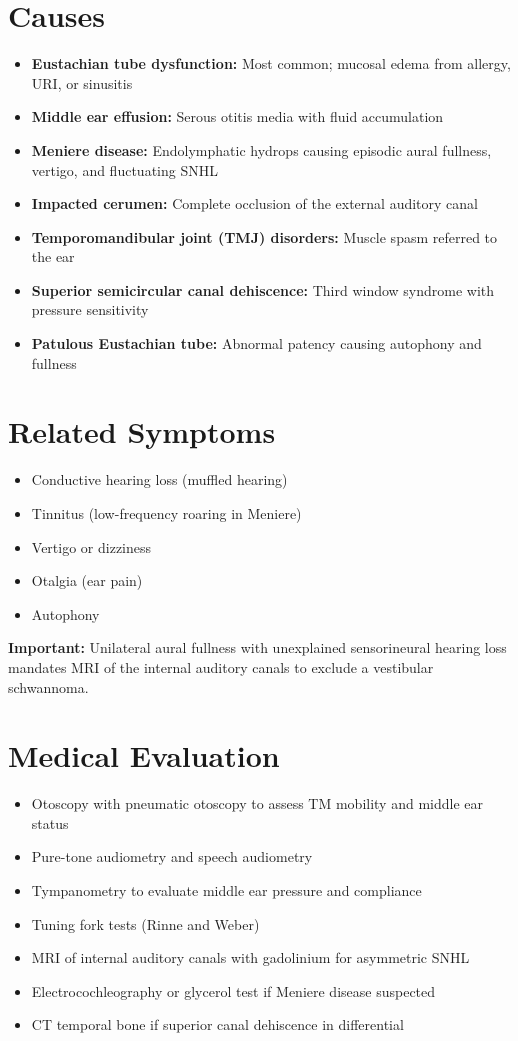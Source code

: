 \section*{Causes}
\begin{itemize}
  \item \textbf{Eustachian tube dysfunction:} Most common; mucosal edema from allergy, URI, or sinusitis
  \item \textbf{Middle ear effusion:} Serous otitis media with fluid accumulation
  \item \textbf{Meniere disease:} Endolymphatic hydrops causing episodic aural fullness, vertigo, and fluctuating SNHL
  \item \textbf{Impacted cerumen:} Complete occlusion of the external auditory canal
  \item \textbf{Temporomandibular joint (TMJ) disorders:} Muscle spasm referred to the ear
  \item \textbf{Superior semicircular canal dehiscence:} Third window syndrome with pressure sensitivity
  \item \textbf{Patulous Eustachian tube:} Abnormal patency causing autophony and fullness
\end{itemize}

\section*{Related Symptoms}
\begin{itemize}
  \item Conductive hearing loss (muffled hearing)
  \item Tinnitus (low-frequency roaring in Meniere)
  \item Vertigo or dizziness
  \item Otalgia (ear pain)
  \item Autophony
\end{itemize}
\textbf{Important:} Unilateral aural fullness with unexplained sensorineural hearing loss mandates MRI of the internal auditory canals to exclude a vestibular schwannoma.

\section*{Medical Evaluation}
\begin{itemize}
  \item Otoscopy with pneumatic otoscopy to assess TM mobility and middle ear status
  \item Pure-tone audiometry and speech audiometry
  \item Tympanometry to evaluate middle ear pressure and compliance
  \item Tuning fork tests (Rinne and Weber)
  \item MRI of internal auditory canals with gadolinium for asymmetric SNHL
  \item Electrocochleography or glycerol test if Meniere disease suspected
  \item CT temporal bone if superior canal dehiscence in differential
\end{itemize}

